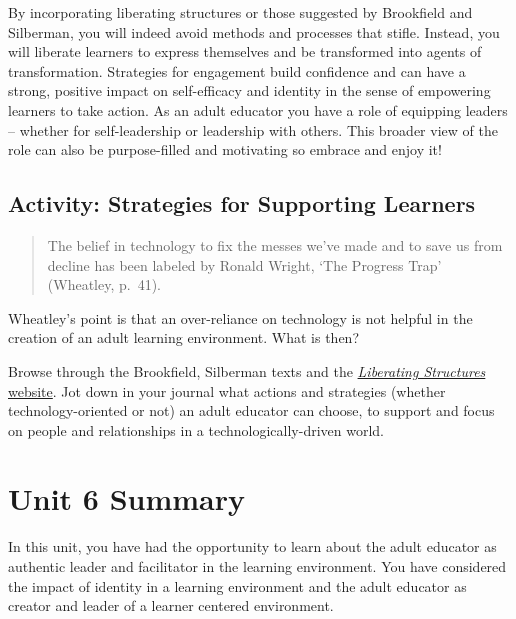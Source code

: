 \documentclass[
]{book}
\begin{document}
By incorporating liberating structures or those suggested by Brookfield and Silberman, you will indeed avoid methods and processes that stifle. Instead, you will liberate learners to express themselves and be transformed into agents of transformation. Strategies for engagement build confidence and can have a strong, positive impact on self-efficacy and identity in the sense of empowering learners to take action. As an adult educator you have a role of equipping leaders -- whether for self-leadership or leadership with others. This broader view of the role can also be purpose-filled and motivating so embrace and enjoy it!

\hypertarget{activity-strategies-for-supporting-learners}{%
\subsection{Activity: Strategies for Supporting Learners}\label{activity-strategies-for-supporting-learners}}

\begin{reflect}
\begin{quote}
The belief in technology to fix the messes we've made and to save us
from decline has been labeled by Ronald Wright, `The Progress Trap'
(Wheatley, p.~41).
\end{quote}

Wheatley's point is that an over-reliance on technology is not helpful
in the creation of an adult learning environment. What is then?

Browse through the Brookfield, Silberman texts and the
\href{http://www.liberatingstructures.com/ls-menu/}{\emph{Liberating
Structures} website}. Jot down in your journal what actions and
strategies (whether technology-oriented or not) an adult educator can
choose, to support and focus on people and relationships in a
technologically-driven world.
\end{reflect}

\hypertarget{unit-6-summary}{%
\section*{Unit 6 Summary}\label{unit-6-summary}}

In this unit, you have had the opportunity to learn about the adult educator as authentic leader and facilitator in the learning environment. You have considered the impact of identity in a learning environment and the adult educator as creator and leader of a learner centered environment.
\end{document}

